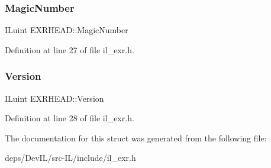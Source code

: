 \subsubsection{\texorpdfstring{Magic\+Number}{MagicNumber}}
{\footnotesize\ttfamily I\+Luint E\+X\+R\+H\+E\+A\+D\+::\+Magic\+Number}



Definition at line 27 of file il\+\_\+exr.\+h.

\mbox{\label{structEXRHEAD_a0b8d9e6fbf77b0769a73dcc333f14371}} 
\subsubsection{\texorpdfstring{Version}{Version}}
{\footnotesize\ttfamily I\+Luint E\+X\+R\+H\+E\+A\+D\+::\+Version}



Definition at line 28 of file il\+\_\+exr.\+h.



The documentation for this struct was generated from the following file\+:\begin{DoxyCompactItemize}
\item 
deps/\+Dev\+I\+L/src-\/\+I\+L/include/il\+\_\+exr.\+h\end{DoxyCompactItemize}
